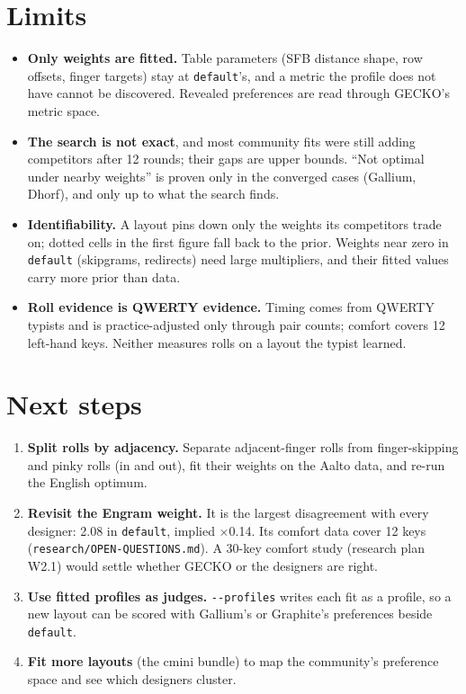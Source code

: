 \documentclass{gecko-paper}
\begin{document}
{\section{Limits}

\begin{itemize}
\setlength{\itemsep}{1pt}\setlength{\parskip}{0pt}
\item
  \textbf{Only weights are fitted.} Table parameters (SFB distance shape, row offsets, finger targets) stay at \texttt{default}'s, and a metric the profile does not have cannot be discovered. Revealed preferences are read through GECKO's metric space.
\item
  \textbf{The search is not exact}, and most community fits were still adding competitors after 12 rounds; their gaps are upper bounds. “Not optimal under nearby weights” is proven only in the converged cases (Gallium, Dhorf), and only up to what the search finds.
\item
  \textbf{Identifiability.} A layout pins down only the weights its competitors trade on; dotted cells in the first figure fall back to the prior. Weights near zero in \texttt{default} (skipgrams, redirects) need large multipliers, and their fitted values carry more prior than data.
\item
  \textbf{Roll evidence is QWERTY evidence.} Timing comes from QWERTY typists and is practice-adjusted only through pair counts; comfort covers 12 left-hand keys. Neither measures rolls on a layout the typist learned.
\end{itemize}

\section{Next steps}

\begin{enumerate}
\def\labelenumi{\arabic{enumi}.}
\setlength{\itemsep}{1pt}\setlength{\parskip}{0pt}
\item
  \textbf{Split rolls by adjacency.} Separate adjacent-finger rolls from finger-skipping and pinky rolls (in and out), fit their weights on the Aalto data, and re-run the English optimum.
\item
  \textbf{Revisit the Engram weight.} It is the largest disagreement with every designer: 2.08 in \texttt{default}, implied $\times$0.14. Its comfort data cover 12 keys (\texttt{research/OPEN-QUESTIONS.md}). A 30-key comfort study (research plan W2.1) would settle whether GECKO or the designers are right.
\item
  \textbf{Use fitted profiles as judges.} \texttt{-\/-profiles} writes each fit as a profile, so a new layout can be scored with Gallium's or Graphite's preferences beside \texttt{default}.
\item
  \textbf{Fit more layouts} (the cmini bundle) to map the community's preference space and see which designers cluster.
\end{enumerate}

}
\end{document}
